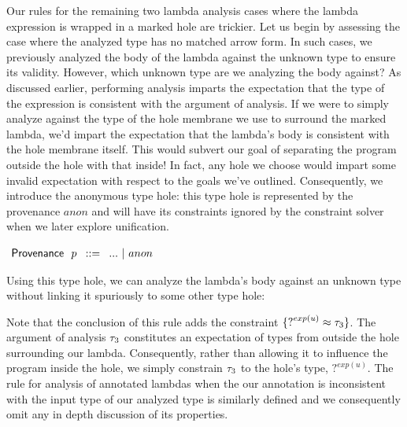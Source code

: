 Our rules for the remaining two lambda analysis cases where the lambda expression is wrapped in a marked hole are trickier. Let us begin by assessing the case where the analyzed type has no matched arrow form. In such cases, we previously analyzed the body of the lambda against the unknown type to ensure its validity. However, which unknown type are we analyzing the body against? As discussed earlier, performing analysis imparts the expectation that the type of the expression is consistent with the argument of analysis. If we were to simply analyze against the type of the hole membrane we use to surround the marked lambda, we'd impart the expectation that the lambda's body is consistent with the hole membrane itself. This would subvert our goal of separating the program outside the hole with that inside! In fact, any hole we choose would impart some invalid expectation with respect to the goals we've outlined. Consequently, we introduce the anonymous type hole: this type hole is represented by the provenance $anon$ and will have its constraints ignored by the constraint solver when we later explore unification.
\begin{center}
    $\arraycolsep=4pt\begin{array}{lll}
    \Prov~~ p & ::= & 
        ... ~\vert~ 
        anon
        \\
    \end{array}$
\end{center}
Using this type hole, we can analyze the lambda's body against an unknown type without linking it spuriously to some other type hole:

\begin{mathpar}

\end{mathpar}
Note that the conclusion of this rule adds the constraint $\{ \TUnknown^{exp(u)} \approx \TMV_3 \}$. The argument of analysis $\TMV_3$ constitutes an expectation of types from outside the hole surrounding our lambda. Consequently, rather than allowing it to influence the program inside the hole, we simply constrain $\TMV_3$ to the hole's type, $?^{exp(u)}$. The rule for analysis of annotated lambdas when the our annotation is inconsistent with the input type of our analyzed type is similarly defined and we consequently omit any in depth discussion of its properties.



